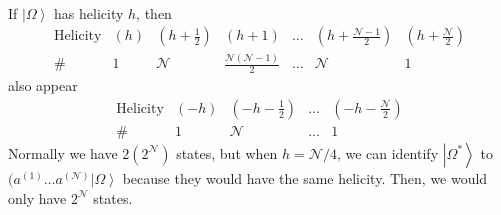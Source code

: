 \documentclass[a4paper,12pt]{article}
\numberwithin{equation}{section}
\numberwithin{exe}{section}
\newcommand{\vac}{{\left|\Omega\right>}}
\begin{document}
\begin{enumerate}
\begin{equation}
\begin{aligned}
			\end{aligned}
		\end{equation}
	If $\vac$ has helicity $h$, then
		\begin{equation}
			\begin{array}{ccccccc}
			\text{Helicity} & (h) & (h + \frac12) & (h+1) & \ldots & (h+ \frac{\mathcal N-1}{2}) & (h+\frac{\mathcal N}{2}) \\
			\# & 1 & \mathcal N & \frac{\mathcal N(\mathcal N-1)}{2} & \ldots & \mathcal N & 1
			\end{array}
		\end{equation}
	also appear
		\begin{equation}
			\begin{array}{ccccc}
			\text{Helicity} & (-h) & (-h - \frac12) & \ldots & (-h-\frac{\mathcal N}{2}) \\
			\# & 1 & \mathcal N & \ldots & 1
			\end{array}
		\end{equation}
	Normally we have $2(2^{\mathcal N})$ states, but when $h=\mathcal N/4$, we can identify $\left|\Omega^*\right> $ to $(a^{(1)}\ldots a^{(\mathcal N)}\vac$ because they would have the same helicity. Then, we would only have $2^{\mathcal N}$ states.
	\end{enumerate}
\end{document}

